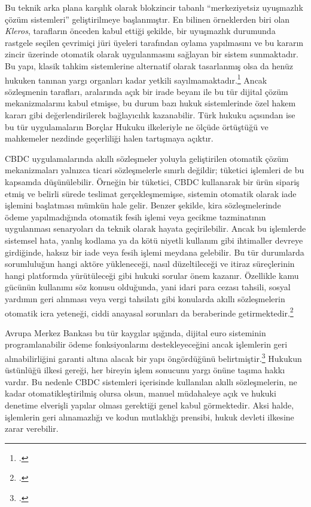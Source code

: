 \documentclass[a4paper,12pt]{article}
\begin{document}
Bu teknik arka plana karşılık olarak blokzincir tabanlı “merkeziyetsiz uyuşmazlık çözüm sistemleri” geliştirilmeye başlanmıştır. En bilinen örneklerden biri olan \textit{Kleros}, tarafların önceden kabul ettiği şekilde, bir uyuşmazlık durumunda rastgele seçilen çevrimiçi jüri üyeleri tarafından oylama yapılmasını ve bu kararın zincir üzerinde otomatik olarak uygulanmasını sağlayan bir sistem sunmaktadır. Bu yapı, klasik tahkim sistemlerine alternatif olarak tasarlanmış olsa da henüz hukuken tanınan yargı organları kadar yetkili sayılmamaktadır.\footcite{wong2020kleros} Ancak sözleşmenin tarafları, aralarında açık bir irade beyanı ile bu tür dijital çözüm mekanizmalarını kabul etmişse, bu durum bazı hukuk sistemlerinde özel hakem kararı gibi değerlendirilerek bağlayıcılık kazanabilir. Türk hukuku açısından ise bu tür uygulamaların Borçlar Hukuku ilkeleriyle ne ölçüde örtüştüğü ve mahkemeler nezdinde geçerliliği halen tartışmaya açıktır.

CBDC uygulamalarında akıllı sözleşmeler yoluyla geliştirilen otomatik çözüm mekanizmaları yalnızca ticari sözleşmelerle sınırlı değildir; tüketici işlemleri de bu kapsamda düşünülebilir. Örneğin bir tüketici, CBDC kullanarak bir ürün sipariş etmiş ve belirli sürede teslimat gerçekleşmemişse, sistemin otomatik olarak iade işlemini başlatması mümkün hale gelir. Benzer şekilde, kira sözleşmelerinde ödeme yapılmadığında otomatik fesih işlemi veya gecikme tazminatının uygulanması senaryoları da teknik olarak hayata geçirilebilir. Ancak bu işlemlerde sistemsel hata, yanlış kodlama ya da kötü niyetli kullanım gibi ihtimaller devreye girdiğinde, haksız bir iade veya fesih işlemi meydana gelebilir. Bu tür durumlarda sorumluluğun hangi aktöre yükleneceği, nasıl düzeltileceği ve itiraz süreçlerinin hangi platformda yürütüleceği gibi hukuki sorular önem kazanır. Özellikle kamu gücünün kullanımı söz konusu olduğunda, yani idari para cezası tahsili, sosyal yardımın geri alınması veya vergi tahsilatı gibi konularda akıllı sözleşmelerin otomatik icra yeteneği, ciddi anayasal sorunları da beraberinde getirmektedir.\footcite{mas2023orchid}

Avrupa Merkez Bankası bu tür kaygılar ışığında, dijital euro sisteminin programlanabilir ödeme fonksiyonlarını destekleyeceğini ancak işlemlerin geri alınabilirliğini garanti altına alacak bir yapı öngördüğünü belirtmiştir.\footcite{ecb2023digital} Hukukun üstünlüğü ilkesi gereği, her bireyin işlem sonucunu yargı önüne taşıma hakkı vardır. Bu nedenle CBDC sistemleri içerisinde kullanılan akıllı sözleşmelerin, ne kadar otomatikleştirilmiş olursa olsun, manuel müdahaleye açık ve hukuki denetime elverişli yapılar olması gerektiği genel kabul görmektedir. Aksi halde, işlemlerin geri alınamazlığı ve kodun mutlaklığı prensibi, hukuk devleti ilkesine zarar verebilir.
\end{document}
